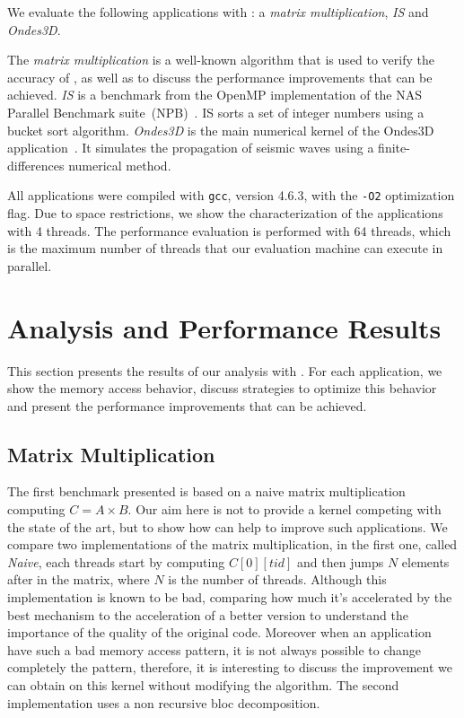 We evaluate the following applications with \TABARNAC: a \emph{matrix multiplication}, \emph{IS} and \emph{Ondes3D}.

The \emph{matrix multiplication} is a well-known algorithm that is used to verify the accuracy of \TABARNAC, as well as to discuss the performance improvements that can be achieved.
\emph{IS} is a benchmark from the OpenMP implementation of the NAS Parallel Benchmark suite~(NPB)~\cite{Jin1999}. IS sorts a set of integer numbers using a bucket sort algorithm.
\emph{Ondes3D} is the main numerical kernel of the Ondes3D application~\cite{Dupros2008}. It simulates the propagation of seismic waves using a finite-differences numerical method.

All applications were compiled with \texttt{gcc}, version 4.6.3, with the \texttt{-O2} optimization flag.
Due to space restrictions, we show the characterization of the applications with 4 threads.
The performance evaluation is performed with 64 threads, which is the maximum number of threads that our evaluation machine can execute in parallel.

\section{Analysis and Performance Results}
\label{sec:expe-analysis}

This section presents the results of our analysis with \TABARNAC.
For each application, we show the memory access behavior, discuss strategies to optimize this behavior and present the performance improvements that can be achieved.


\subsection{Matrix Multiplication}
\label{sec:exp-mat}

The first benchmark presented is based on a naive matrix multiplication
computing $C=A \times B$. Our aim here is not to provide a kernel competing with the
state of the art, but to show how \TABARNAC can help to improve such
applications. We compare two implementations of the matrix multiplication, in
the first one, called \emph{Naive}, each threads start by computing
$C[0][tid]$ and then jumps $N$ elements after in the matrix, where $N$ is the
number of threads. Although this implementation is known to be bad, comparing
how much it's accelerated by the best mechanism to the acceleration of a
better version to understand the importance of the quality of the original
code. Moreover when an application have such a bad memory access pattern, it
is not always possible to change completely the pattern, therefore, it is
interesting to discuss the improvement we can obtain on this kernel without
modifying the algorithm. The second implementation uses a non recursive bloc
decomposition.

